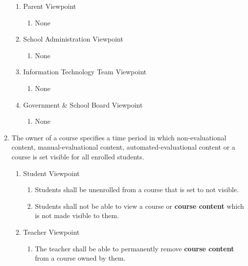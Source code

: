 \documentclass[]{article}
\begin{document}
\begin{enumerate}[{BE}1.]
\begin{enumerate}[{VP2}.1]
		\item Parent Viewpoint
			\begin{enumerate}
				\item None
			\end{enumerate}

		\item School Administration Viewpoint
			\begin{enumerate}
				\item None
			\end{enumerate}

		\item Information Technology Team Viewpoint
			\begin{enumerate}
				\item None
			\end{enumerate}

		\item Government \& School Board Viewpoint
			\begin{enumerate}
				\item None
			\end{enumerate}

	\end{enumerate}

  \item The owner of a course specifies a time period in which non-evaluational
    content, manual-evaluational content, automated-evaluational content or a
    course is set visible for all enrolled students.
	\begin{enumerate}[{VP2}.1]

		\item Student Viewpoint
			\begin{enumerate}
        \item Students shall be unenrolled from a course that is set to not
          visible.

        \item Students shall not be able to view a course or
          \textbf{course content} which is not made visible to them.
			\end{enumerate}

		\item Teacher Viewpoint
			\begin{enumerate}
        \item The teacher shall be able to permanently remove \textbf{course
          content} from a course owned by them.
			\end{enumerate}


\end{enumerate}
\end{enumerate}
\end{document}
